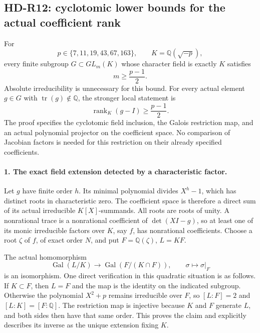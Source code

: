 \subsection{HD-R12: cyclotomic lower bounds for the actual coefficient rank}
\label{sec:cyclotomic-coefficient-rank}

For
\[
 p\in\{7,11,19,43,67,163\},\qquad K=\mathbb Q(\sqrt{-p}),
                                                               \tag{R12.1}
\]
every finite subgroup \(G\subset GL_m(K)\) whose character
field is exactly \(K\) satisfies
\[
                    m\ge\frac{p-1}{2}.                     \tag{R12.2}
\]
Absolute irreducibility is unnecessary for this bound.
For every actual element \(g\in G\) with
\(\operatorname{tr}(g)\notin\mathbb Q\), the stronger local
statement is
\[
               \operatorname{rank}_K(g-I)\ge\frac{p-1}{2}.
                                                               \tag{R12.3}
\]
The proof specifies the cyclotomic field inclusion, the Galois
restriction map, and an actual polynomial projector on the
coefficient space. No comparison of Jacobian factors is needed
for this restriction on their already specified coefficients.

\paragraph{1. The exact field extension detected by a characteristic factor.}
Let \(g\) have finite order \(h\). Its minimal polynomial
divides \(X^h-1\), which has distinct roots in characteristic
zero. The coefficient space is therefore a direct sum of its
actual irreducible \(K[X]\)-summands. All roots are roots of
unity. A nonrational trace is a nonrational coefficient of
\(\det(XI-g)\), so at least one of its monic irreducible
factors over \(K\), say \(f\), has nonrational coefficients.
Choose a root \(\zeta\) of \(f\), of exact order \(N\),
and put \(F=\mathbb Q(\zeta)\), \(L=KF\).

The actual homomorphism
\[
 \operatorname{Gal}(L/K)\longrightarrow
       \operatorname{Gal}(F/(K\cap F)),\qquad
                   \sigma\longmapsto\sigma|_F              \tag{R12.4}
\]
is an isomorphism. One direct verification in this quadratic
situation is as follows. If \(K\subset F\), then \(L=F\)
and the map is the identity on the indicated subgroup. Otherwise
the polynomial \(X^2+p\) remains irreducible over \(F\),
so \([L:F]=2\) and \([L:K]=[F:\mathbb Q]\). The restriction
map is injective because \(K\) and \(F\) generate \(L\),
and both sides then have that same order. This proves the claim
and explicitly describes its inverse as the unique extension
fixing \(K\).

